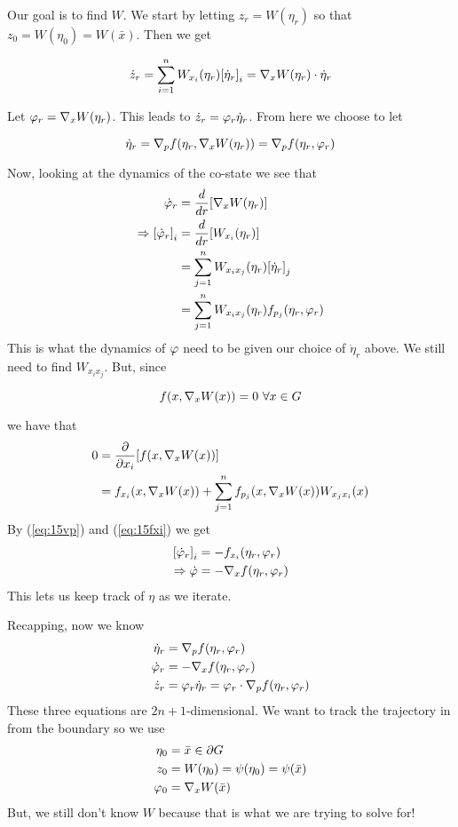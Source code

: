 Our goal is to find $W$.
We start by letting $z_r=W(\eta_r)$ so that $z_0=W(\eta_0)=W(\bar{x})$.
Then we get

\begin{equation*}
\dot{z}_r = \sum_{i=1}^n W_{x_i}(\eta_r){[\dot{\eta}_r]}_i = \nabla_xW(\eta_r)\cdot \dot{\eta}_r
\end{equation*}

Let $\varphi_r=\nabla_xW(\eta_r)$.
This leads to $\dot{z}_r=\varphi_r\dot{\eta}_r$.
From here we choose to let

\begin{equation*}
\dot{\eta}_r = \nabla_p f(\eta_r,\nabla_xW(\eta_r)) = \nabla_p f(\eta_r,\varphi_r)
\end{equation*}

Now, looking at the dynamics of the co-state we see that
\begin{align}
\label{eq:15vp}
\dot{\varphi}_r &= \frac{d}{dr}[\nabla_xW(\eta_r)] \nonumber \\
\Rightarrow {[\dot{\varphi}_r]}_i &= \frac{d}{dr}[W_{x_i}(\eta_r)] \nonumber \\
&= \sum_{j=1}^n W_{x_i x_j}(\eta_r){[\dot{\eta}_r]}_j \nonumber \\
&= \sum_{j=1}^n W_{x_i x_j}(\eta_r)f_{p_j}(\eta_r,\varphi_r)
\end{align}
This is what the dynamics of $\varphi$ need to be given our choice of $\dot{\eta}_r$ above.
We still need to find $W_{x_i x_j}$.
But, since

\begin{equation*}
f(x,\nabla_xW(x)) = 0~\forall x\in G
\end{equation*}

we have that
\begin{align}
\label{eq:15fxi}
0 &= \frac{\partial}{\partial x_i}[f(x,\nw(x))] \nonumber \\%
&= f_{x_i}(x,\nw(x)) + \sum_{j=1}^n f_{p_j}(x,\nw(x))W_{x_j x_i}(x)
\end{align}
By (\ref{eq:15vp}) and (\ref{eq:15fxi}) we get
\begin{align*}
{[\dot{\varphi}_r]}_i &= -f_{x_i}(\eta_r,\varphi_r) \\
\Rightarrow \dot{\varphi} &= -\nabla_x f(\eta_r,\varphi_r)
\end{align*}
This lets us keep track of $\eta$ as we iterate.

Recapping, now we know
\begin{align*}
\dot{\eta}_r &= \nabla_p f(\eta_r,\varphi_r) \\
\dot{\varphi}_r &= -\nabla_x f(\eta_r,\varphi_r) \\
\dot{z}_r &= \varphi_r\dot{\eta}_r = \varphi_r\cdot \nabla_p f(\eta_r,\varphi_r)
\end{align*}
These three equations are $2n+1$-dimensional.
We want to track the trajectory in from the boundary so we use
\begin{align*}
\eta_0 &= \bar{x} \in \partial G \\
z_0 &= W(\eta_0) = \psi(\eta_0) = \psi(\bar{x}) \\
\varphi_0 &= \nabla_xW(\bar{x})
\end{align*}
But, we still don't know $W$ because that is what we are trying to solve for!


